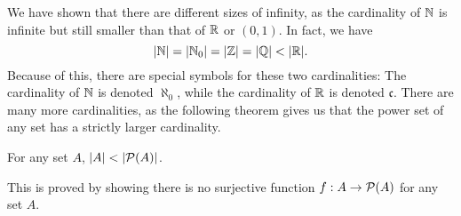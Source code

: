 \documentclass{article}
\begin{document}
We have shown that there are different sizes of infinity, as the cardinality of ${\mathbb{N}}$ is infinite but still smaller than that of ${\mathbb{R}}$ or $(0,1)$. In fact, we have
$$ |{\mathbb{N}}| = |{\mathbb{N}}_0| = |{\mathbb{Z}}| = |{\mathbb{Q}}| < | {\mathbb{R}}|.$$
Because of this, there are special symbols for these two cardinalities: The cardinality of ${\mathbb{N}}$ is denoted $\aleph_0$, while the cardinality of ${\mathbb{R}}$ is denoted $\mathfrak{c}$. There are many more cardinalities, as the following theorem gives us that the power set of any set has a strictly larger cardinality.

\begin{theorem}
\label{thm:cantor}
     For any set $A$, $|A| < |\mathcal{P}(A)|$.
\end{theorem}
This is proved by showing there is no surjective function $f: A \to \mathcal{P}(A)$ for any set $A$.
\end{document}

